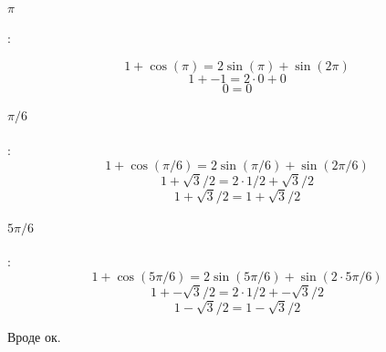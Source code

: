 \documentclass{article}
\begin{document}
\paragraph{$\pi$}: 

$$1+\cos(\pi)=2\sin(\pi)+\sin(2\pi)$$
$$1+-1=2\cdot{}0+0$$
$$0=0$$

\paragraph{$\pi/6$}:
$$1+\cos(\pi/6)=2\sin(\pi/6)+\sin(2\pi/6)$$
$$1+\sqrt{3}/2=2\cdot{}1/2+\sqrt{3}/2$$
$$1+\sqrt{3}/2=1+\sqrt{3}/2$$

\paragraph{$5\pi/6$}:
$$1+\cos(5\pi/6)=2\sin(5\pi/6)+\sin(2\cdot{}5\pi/6)$$
$$1+-\sqrt{3}/2=2\cdot{}1/2+-\sqrt{3}/2$$
$$1-\sqrt{3}/2=1-\sqrt{3}/2$$

Вроде ок.
\end{document}
